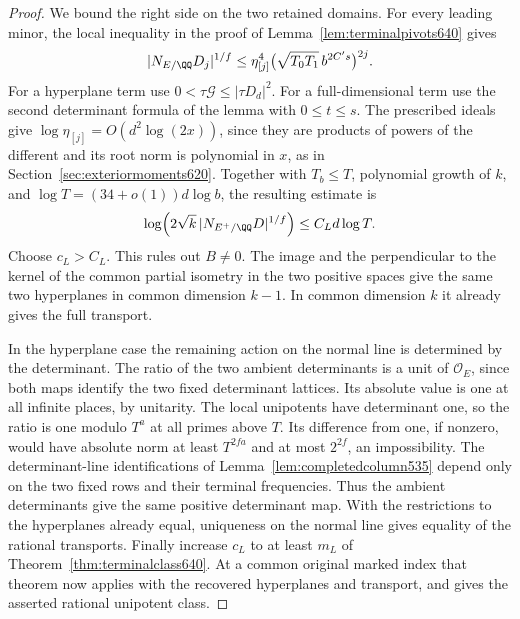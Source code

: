 \documentclass[a4paper,11pt]{article}
\theoremstyle{definition}
\theoremstyle{remark}
\numberwithin{equation}{section}
\begin{document}
\begin{proof}
We bound the right side on the two retained domains. For every
leading minor, the local inequality in the proof of
Lemma~\ref{lem:terminalpivots640} gives
\[
 |N_{E/\QQ} D_j|^{1/f}
       \le \eta_{[j]}^4\bigl(\sqrt{T_0T_1}\,b^{2C's}\bigr)^{2j}.
\]
For a hyperplane term use
\(0<\tau\mathcal G\le|\tau D_d|^2\). For a full-dimensional
term use the second determinant formula of the lemma with
\(0\le t\le s\). The prescribed ideals give
\(\log\eta_{[j]}=O(d^2\log(2x))\), since they are products
of powers of the different and its root norm is polynomial
in \(x\), as in Section~\ref{sec:exteriormoments620}.
Together with \(T_b\le T\), polynomial growth of \(k\), and
\(\log T=(34+o(1))d\log b\), the resulting estimate is
\[
        \log\!\left(2\sqrt{k}\,|N_{E^+/\QQ}D|^{1/f}\right)
                         \le C_L d\log T .
\]
Choose \(c_L>C_L\). This rules out \(B\ne0\). The image and
the perpendicular to the kernel of the common partial isometry
in the two positive spaces give the same two hyperplanes in
common dimension \(k-1\). In common dimension \(k\) it already
gives the full transport.

In the hyperplane case the remaining action on the normal
line is determined by the determinant. The ratio of the two
ambient determinants is a unit of \(\mathcal O_E\), since
both maps identify the two fixed determinant lattices. Its
absolute value is one at all infinite places, by unitarity.
The local unipotents have determinant one, so the ratio is
one modulo \(T^a\) at all primes above \(T\). Its difference
from one, if nonzero, would have absolute norm at least
\(T^{2fa}\) and at most \(2^{2f}\), an impossibility.
The determinant-line identifications of
Lemma~\ref{lem:completedcolumn535} depend only on the two
fixed rows and their terminal frequencies. Thus the ambient
determinants give the same positive determinant map. With
the restrictions to the hyperplanes already equal, uniqueness
on the normal line gives equality of the rational transports.
Finally increase \(c_L\) to at least \(m_L\) of
Theorem~\ref{thm:terminalclass640}. At a common original marked
index that theorem now applies with the recovered hyperplanes
and transport, and gives the asserted rational unipotent class.
\end{proof}
\end{document}
